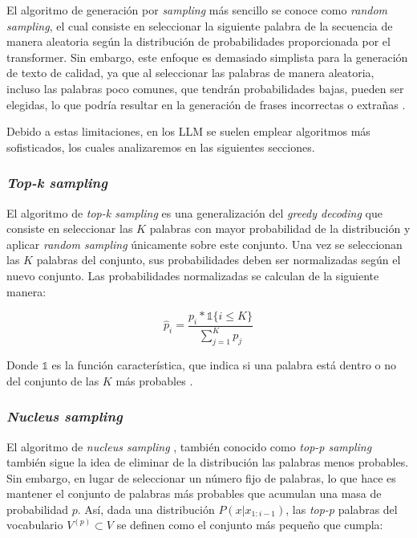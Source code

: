 \documentclass[11pt,spanish,listoffigures,listoftables]{tfgetsinf}
\begin{document}
 El algoritmo de generación por \textit{sampling} más sencillo se conoce como \textit{random sampling}, el cual consiste en seleccionar la siguiente palabra de la secuencia de manera aleatoria según la distribución de probabilidades proporcionada por el transformer. Sin embargo, este enfoque es demasiado simplista para la generación de texto de calidad, ya que al seleccionar las palabras de manera aleatoria, incluso las palabras poco comunes, que tendrán probabilidades bajas, pueden ser elegidas, lo que podría resultar en la generación de frases incorrectas o extrañas \cite{jurafsky2023speech}.

Debido a estas limitaciones, en los LLM se suelen emplear algoritmos más sofisticados, los cuales analizaremos en las siguientes secciones.

\subsubsection{\textit{Top-k sampling}}

El algoritmo de \textit{top-k sampling} es una generalización del \textit{greedy decoding} que consiste en seleccionar las $K$ palabras con mayor probabilidad de la distribución y aplicar \textit{random sampling} únicamente sobre este conjunto. Una vez se seleccionan las $K$ palabras del conjunto, sus probabilidades deben ser normalizadas según el nuevo conjunto. Las probabilidades normalizadas se calculan de la siguiente manera:

\begin{equation}
\hat{p}_i = \frac{p_i * \mathbb{1}\{i \leq K\}}{\sum_{j = 1}^K p_j}
\end{equation}

Donde $\mathbb{1}$ es la función característica, que indica si una palabra está dentro o no del conjunto de las $K$ más probables \cite{nadeem2020systematiccharacterizationsamplingalgorithms}.

\subsubsection{\textit{Nucleus sampling}}

El algoritmo de \textit{nucleus sampling} \cite{holtzman2020curiouscaseneuraltext}, también conocido como \textit{top-p sampling} también sigue la idea de eliminar de la distribución las palabras menos probables. Sin embargo, en lugar de seleccionar un número fijo de palabras, lo que hace es mantener el conjunto de palabras más probables que acumulan una masa de probabilidad $p$. Así, dada una distribución $P(x |x_{1:i-1})$, las \textit{top-p} palabras del vocabulario $V^{(p)} \subset V$ se definen como el conjunto más pequeño que cumpla:
\end{document}
